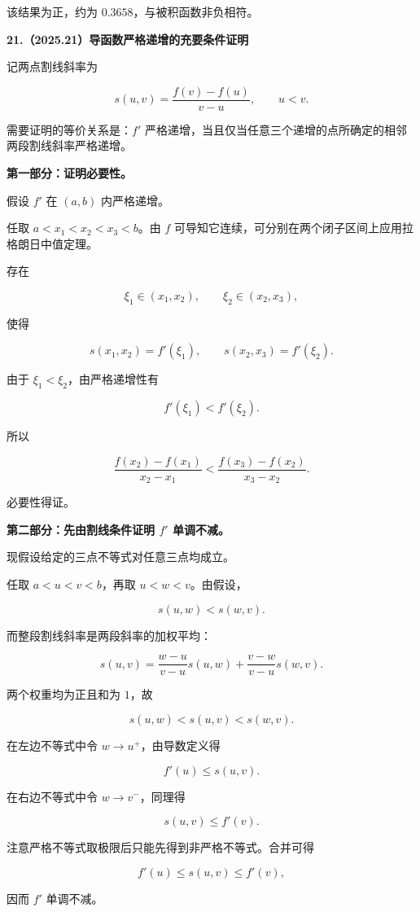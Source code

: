 \documentclass[UTF8,11pt,fontset=windows]{ctexart}
\begin{document}
该结果为正，约为 $0.3658$，与被积函数非负相符。

\clearpage

\textbf{21.（2025.21）导函数严格递增的充要条件证明}

记两点割线斜率为

$$
s(u,v)=\frac{f(v)-f(u)}{v-u},\qquad u<v.
$$

需要证明的等价关系是：$f'$ 严格递增，当且仅当任意三个递增的点所确定的相邻两段割线斜率严格递增。

\textbf{第一部分：证明必要性。}

假设 $f'$ 在 $(a,b)$ 内严格递增。

任取 $a<x_1<x_2<x_3<b$。由 $f$ 可导知它连续，可分别在两个闭子区间上应用拉格朗日中值定理。

存在

$$
\xi_1\in(x_1,x_2),\qquad \xi_2\in(x_2,x_3),
$$

使得

$$
s(x_1,x_2)=f'(\xi_1),\qquad
s(x_2,x_3)=f'(\xi_2).
$$

由于 $\xi_1<\xi_2$，由严格递增性有

$$
f'(\xi_1)<f'(\xi_2).
$$

所以

$$
\frac{f(x_2)-f(x_1)}{x_2-x_1}
<\frac{f(x_3)-f(x_2)}{x_3-x_2}.
$$

必要性得证。

\textbf{第二部分：先由割线条件证明 $f'$ 单调不减。}

现假设给定的三点不等式对任意三点均成立。

任取 $a<u<v<b$，再取 $u<w<v$。由假设，

$$
s(u,w)<s(w,v).
$$

而整段割线斜率是两段斜率的加权平均：

$$
s(u,v)=\frac{w-u}{v-u}s(u,w)
+\frac{v-w}{v-u}s(w,v).
$$

两个权重均为正且和为 $1$，故

$$
s(u,w)<s(u,v)<s(w,v).
$$

在左边不等式中令 $w\to u^+$，由导数定义得

$$
f'(u)\le s(u,v).
$$

在右边不等式中令 $w\to v^-$，同理得

$$
s(u,v)\le f'(v).
$$

注意严格不等式取极限后只能先得到非严格不等式。合并可得

$$
f'(u)\le s(u,v)\le f'(v),
$$

因而 $f'$ 单调不减。
\end{document}
